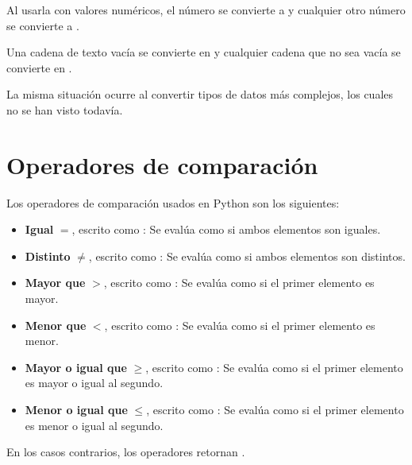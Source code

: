 Al usarla con valores numéricos, el número  se convierte a  y cualquier otro número se convierte a .


Una cadena de texto vacía se convierte en  y cualquier cadena que no sea vacía se convierte en .


La misma situación ocurre al convertir tipos de datos más complejos, los cuales no se han visto todavía.


\section{Operadores de comparación}

Los operadores de comparación usados en Python son los siguientes:

\begin{itemize}
  \item \textbf{Igual} $=$, escrito como \ttt{==}: Se evalúa como  si ambos elementos son iguales.
  
  \item \textbf{Distinto} $\neq$, escrito como \ttt{!=}: Se evalúa como  si ambos elementos son distintos.
  
  \item \textbf{Mayor que} $>$, escrito como \ttt{>}: Se evalúa como  si el primer elemento es mayor.
  
  \item \textbf{Menor que} $<$, escrito como \ttt{<}: Se evalúa como  si el primer elemento es menor.
  
  \item \textbf{Mayor o igual que} $\geq$, escrito como \ttt{>=}: Se evalúa como  si el primer elemento es mayor o igual al segundo.
  
  \item \textbf{Menor o igual que} $\leq$, escrito como \ttt{<=}: Se evalúa como  si el primer elemento es menor o igual al segundo.
  
\end{itemize}

En los casos contrarios, los operadores retornan .

